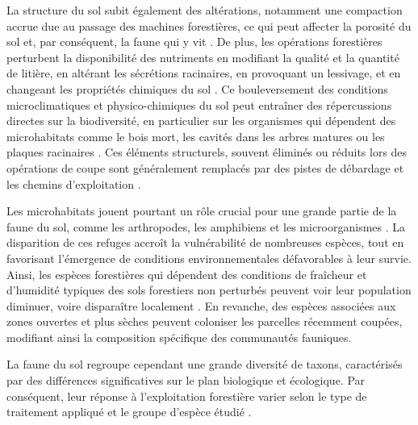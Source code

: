 La structure du sol subit également des altérations, notamment une compaction accrue due au passage des machines forestières, ce qui peut affecter la porosité du sol et, par conséquent, la faune qui y vit \citep{Battigelli2004Shorttermimpact,Mazerolle2021Woodlandsalamander}. 
De plus, les opérations forestières perturbent la disponibilité des nutriments en modifiant la qualité et la quantité de litière, en altérant les sécrétions racinaires, en provoquant un lessivage, et en changeant les propriétés chimiques du sol \citep{Covington1981Changesforest,Marshall2000Impactsforest,Lindo2003Microbialbiomass,Battigelli2004Shorttermimpact}. 
Ce bouleversement des conditions microclimatiques et physico-chimiques du sol peut entraîner des répercussions directes sur la biodiversité, 
en particulier sur les organismes qui dépendent des microhabitats comme le bois mort, les cavités dans les arbres matures ou les plaques racinaires \citep{Berg1994ThreatenedPlant,Spies1999Dynamicforest,Bouget2005Shorttermeffect,Christensen2005Deadwood,Brassard2008EffectsForest}.
Ces éléments structurels, souvent éliminés ou réduits lors des opérations de coupe sont généralement remplacés par des pistes de débardage et les chemins d'exploitation \citep{Hansen1991ConservingBiodiversity}. 

Les microhabitats jouent pourtant un rôle crucial pour une grande partie de la faune du sol, comme les arthropodes, les amphibiens et les microorganismes \citep{Paillet2010Biodiversitydifferences,Fedrowitz2014Canretention,Chaudhary2016Impactforest}. 
La disparition de ces refuges accroît la vulnérabilité de nombreuses espèces, tout en favorisant l’émergence de conditions environnementales défavorables à leur survie. 
Ainsi, les espèces forestières qui dépendent des conditions de fraîcheur et d’humidité typiques des sols forestiers non perturbés peuvent voir leur population diminuer, voire disparaître localement \citep{Kudrin2023metaanalysiseffects}. 
En revanche, des espèces associées aux zones ouvertes et plus sèches peuvent coloniser les parcelles récemment coupées, modifiant ainsi la composition spécifique des communautés fauniques.

La faune du sol regroupe cependant une grande diversité de taxons, caractérisés par des différences significatives sur le plan biologique et écologique. 
Par conséquent, leur réponse à l'exploitation forestière varier selon le type de traitement appliqué et le groupe d'espèce étudié \citep{Malmstrom2009Dynamicssoil,Paillet2010Biodiversitydifferences}.


